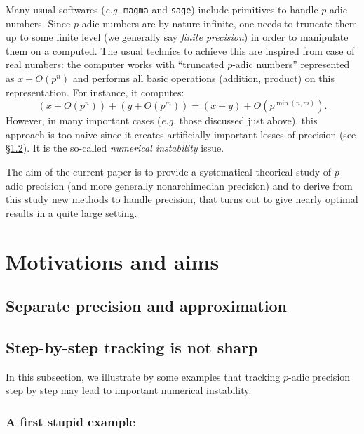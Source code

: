 \documentclass{amsart}
\begin{document}
Many usual softwares (\emph{e.g.} {\tt magma} and {\tt sage}) include 
primitives to handle $p$-adic numbers. Since $p$-adic numbers are by 
nature infinite, one needs to truncate them up to some finite level (we 
generally say \emph{finite precision}) in order to manipulate them on a 
computed. The usual technics to achieve this are inspired from case of 
real numbers: the computer works with ``truncated $p$-adic numbers'' 
represented as $x + O(p^n)$ and performs all basic operations (addition, 
product) on this representation. For instance, it computes: 
$$(x + O(p^n)) + (y + O(p^m)) = (x+y) + O(p^{\min(n,m)}).$$
However, in many important cases (\emph{e.g.} those discussed just 
above), this approach is too naive since it creates artificially 
important losses of precision (see \S\ref{ssec:stepbystep}). 
It is the so-called \emph{numerical instability} issue.

The aim of the current paper is to provide a systematical theorical 
study of $p$-adic precision (and more generally nonarchimedian 
precision) and to derive from this study new methods to handle 
precision, that turns out to give nearly optimal results in a quite 
large setting.

\section{Motivations and aims}


\subsection{Separate precision and approximation}


\subsection{Step-by-step tracking is not sharp}
\label{ssec:stepbystep}

In this subsection, we illustrate by some examples that tracking
$p$-adic precision step by step may lead to important numerical
instability.

\subsubsection*{A first stupid example}
\end{document}
